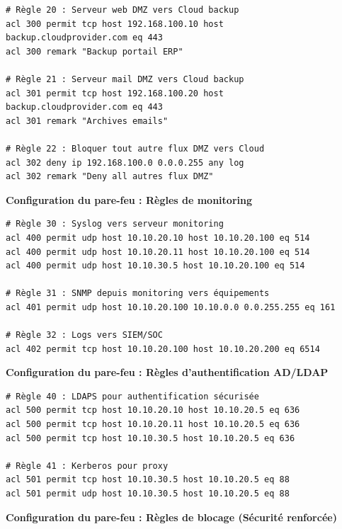 \begin{verbatim}
# Règle 20 : Serveur web DMZ vers Cloud backup
acl 300 permit tcp host 192.168.100.10 host 
backup.cloudprovider.com eq 443
acl 300 remark "Backup portail ERP"

# Règle 21 : Serveur mail DMZ vers Cloud backup
acl 301 permit tcp host 192.168.100.20 host 
backup.cloudprovider.com eq 443
acl 301 remark "Archives emails"

# Règle 22 : Bloquer tout autre flux DMZ vers Cloud
acl 302 deny ip 192.168.100.0 0.0.0.255 any log
acl 302 remark "Deny all autres flux DMZ"
\end{verbatim}

\medskip

\noindent \textbf{Configuration du pare-feu : Règles de monitoring}

\begin{verbatim}
# Règle 30 : Syslog vers serveur monitoring
acl 400 permit udp host 10.10.20.10 host 10.10.20.100 eq 514
acl 400 permit udp host 10.10.20.11 host 10.10.20.100 eq 514
acl 400 permit udp host 10.10.30.5 host 10.10.20.100 eq 514

# Règle 31 : SNMP depuis monitoring vers équipements
acl 401 permit udp host 10.10.20.100 10.10.0.0 0.0.255.255 eq 161

# Règle 32 : Logs vers SIEM/SOC
acl 402 permit tcp host 10.10.20.100 host 10.10.20.200 eq 6514
\end{verbatim}

\medskip

\noindent \textbf{Configuration du pare-feu : Règles d'authentification AD/LDAP}

\begin{verbatim}
# Règle 40 : LDAPS pour authentification sécurisée
acl 500 permit tcp host 10.10.20.10 host 10.10.20.5 eq 636
acl 500 permit tcp host 10.10.20.11 host 10.10.20.5 eq 636
acl 500 permit tcp host 10.10.30.5 host 10.10.20.5 eq 636

# Règle 41 : Kerberos pour proxy
acl 501 permit tcp host 10.10.30.5 host 10.10.20.5 eq 88
acl 501 permit udp host 10.10.30.5 host 10.10.20.5 eq 88
\end{verbatim}

\medskip

\noindent \textbf{Configuration du pare-feu : Règles de blocage (Sécurité renforcée)}

